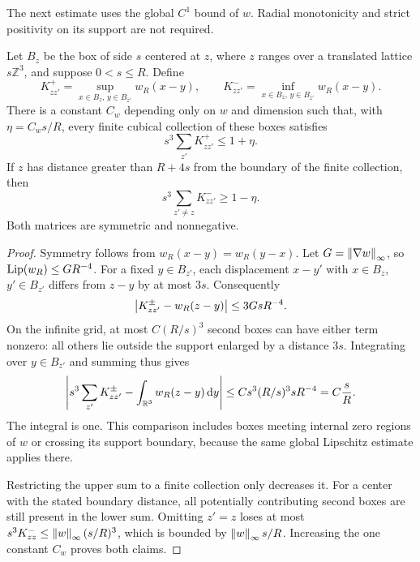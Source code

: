 The next estimate uses the global $C^1$ bound of $w$.  Radial monotonicity
and strict positivity on its support are not required.

\begin{lemma}
\label{k:kernel-rows}
Let $B_z$ be the box of side $s$ centered at $z$, where $z$ ranges
over a translated lattice $s\mathbb Z^3$, and suppose $0<s\le R$.
Define
\[
 K^+_{zz'}=\sup_{x\in B_z,\,y\in B_{z'}}w_R(x-y),
 \qquad
 K^-_{zz'}=\inf_{x\in B_z,\,y\in B_{z'}}w_R(x-y).
\]
There is a constant $C_w$ depending only on $w$ and dimension such that,
with $\eta=C_ws/R$, every finite cubical collection of these boxes
satisfies
\begin{equation}
 s^3\sum_{z'}K^+_{zz'}\le1+\eta.
 \label{k:upper-row}
\end{equation}
If $z$ has distance greater than $R+4s$ from the boundary of the finite
collection, then
\begin{equation}
 s^3\sum_{z'\ne z}K^-_{zz'}\ge1-\eta.
 \label{k:lower-row}
\end{equation}
Both matrices are symmetric and nonnegative.
\end{lemma}

\begin{proof}
Symmetry follows from $w_R(x-y)=w_R(y-x)$.  Let
$G=\left\lVert\nabla w\right\rVert_\infty$, so $\operatorname{Lip}(w_R)\le GR^{-4}$.
For a fixed $y\in B_{z'}$, each displacement $x-y'$ with
$x\in B_z$, $y'\in B_{z'}$ differs from $z-y$ by at most
$3s$.  Consequently
\[
 \left|K^\pm_{zz'}-w_R(z-y)\right|\le3GsR^{-4}.
\]
On the infinite grid, at most $C(R/s)^3$ second boxes can have either
term nonzero: all others lie outside the support enlarged by a distance
$3s$.  Integrating over $y\in B_{z'}$ and summing thus gives
\[
 \left|s^3\sum_{z'}K^\pm_{zz'}-
                  \int_{\mathbb R^3}w_R(z-y)\,\mathrm d y\right|
 \le Cs^3(R/s)^3sR^{-4}=C\frac sR.
\]
The integral is one.  This comparison includes boxes meeting internal
zero regions of $w$ or crossing its support boundary, because the same
global Lipschitz estimate applies there.

Restricting the upper sum to a finite collection only decreases it.
For a center with the stated boundary distance, all potentially
contributing second boxes are still present in the lower sum.  Omitting
$z'=z$ loses at most
$s^3K^-_{zz}\le\left\lVert w\right\rVert_\infty(s/R)^3$, which is bounded by
$\left\lVert w\right\rVert_\infty s/R$.  Increasing the one constant $C_w$ proves both
claims.
\end{proof}

